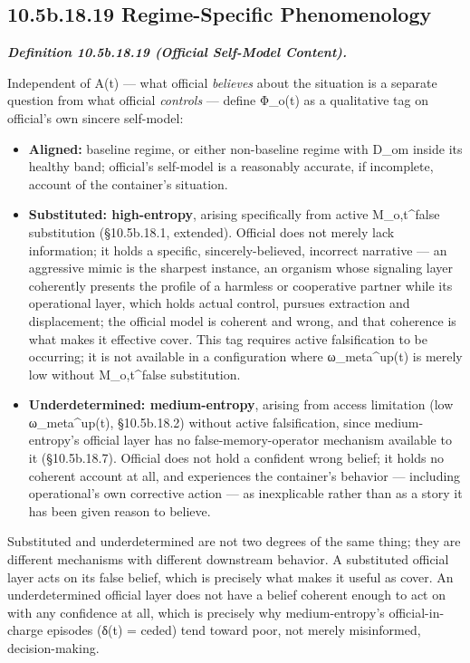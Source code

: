 \documentclass[
]{article}
\begin{document}
\hypertarget{b.18.19-regime-specific-phenomenology}{%
\subsection{10.5b.18.19 Regime-Specific
Phenomenology}\label{b.18.19-regime-specific-phenomenology}}

\emph{\textbf{Definition 10.5b.18.19 (Official Self-Model Content).}}

Independent of A(t) --- what official \emph{believes} about the
situation is a separate question from what official \emph{controls} ---
define Φ\_o(t) as a qualitative tag on official's own sincere
self-model:

\begin{itemize}
\item
  \textbf{Aligned:} baseline regime, or either non-baseline regime with
  D\_om inside its healthy band; official's self-model is a reasonably
  accurate, if incomplete, account of the container's situation.
\item
  \textbf{Substituted: high-entropy}, arising specifically from active
  M\_o,t\^{}false substitution (§10.5b.18.1, extended). Official does
  not merely lack information; it holds a specific, sincerely-believed,
  incorrect narrative --- an aggressive mimic is the sharpest instance,
  an organism whose signaling layer coherently presents the profile of a
  harmless or cooperative partner while its operational layer, which
  holds actual control, pursues extraction and displacement; the
  official model is coherent and wrong, and that coherence is what makes
  it effective cover. This tag requires active falsification to be
  occurring; it is not available in a configuration where
  ω\_meta\^{}up(t) is merely low without M\_o,t\^{}false substitution.
\item
  \textbf{Underdetermined: medium-entropy}, arising from access
  limitation (low ω\_meta\^{}up(t), §10.5b.18.2) without active
  falsification, since medium-entropy's official layer has no
  false-memory-operator mechanism available to it (§10.5b.18.7).
  Official does not hold a confident wrong belief; it holds no coherent
  account at all, and experiences the container's behavior --- including
  operational's own corrective action --- as inexplicable rather than as
  a story it has been given reason to believe.
\end{itemize}

Substituted and underdetermined are not two degrees of the same thing;
they are different mechanisms with different downstream behavior. A
substituted official layer acts on its false belief, which is precisely
what makes it useful as cover. An underdetermined official layer does
not have a belief coherent enough to act on with any confidence at all,
which is precisely why medium-entropy's official-in-charge episodes
(δ(t) = ceded) tend toward poor, not merely misinformed,
decision-making.
\end{document}
